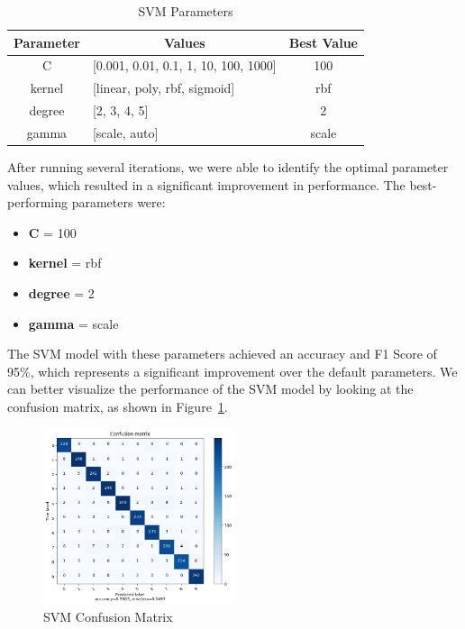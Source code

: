 \documentclass[conference]{IEEEtran}
\begin{document}
\begin{table}[!h]
    \centering
    \begin{tabular}{|c|l|c|}
    \hline
    \textbf{Parameter} & \multicolumn{1}{c|}{\textbf{Values}}     & \multicolumn{1}{l|}{\textbf{Best Value}} \\ \hline
    C                  & {[}0.001, 0.01, 0.1, 1, 10, 100, 1000{]} & 100                                      \\ \hline
    kernel             & {[}linear, poly, rbf, sigmoid{]}         & rbf                                      \\ \hline
    degree             & {[}2, 3, 4, 5{]}                         & 2                                        \\ \hline
    gamma              & {[}scale, auto{]}                        & scale                                    \\ \hline
    \end{tabular}
    \caption{SVM Parameters \label{tab:svm_parameters}}
\end{table}

After running several iterations, we were able to identify the optimal parameter values, which resulted in a significant improvement in performance. The best-performing parameters were: 

\begin{itemize}
    \item \textbf{C} = 100
    \item \textbf{kernel} = rbf
    \item \textbf{degree} = 2
    \item \textbf{gamma} = scale
\end{itemize}
The SVM model with these parameters achieved an accuracy and F1 Score of 95\%, which represents a significant improvement over the default parameters.
We can better visualize the performance of the SVM model by looking at the confusion matrix, as shown in Figure~\ref{fig:svm_confusion_matrix}.

\begin{figure}[!h]
    \centering
    \includegraphics[width=0.5\textwidth]{assets/svm-confusion-matrix.png}
    \caption{SVM Confusion Matrix}
    \label{fig:svm_confusion_matrix}
\end{figure}
\end{document}
